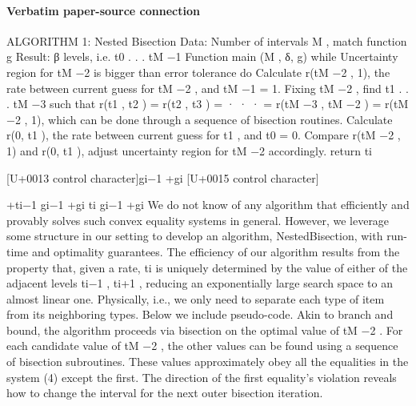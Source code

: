 \documentclass[10pt]{article}
\begin{document}
\paragraph{Verbatim paper-source connection}
\begin{ReviewVerbatim}
ALGORITHM 1: Nested Bisection
Data: Number of intervals M , match function g
Result: β levels, i.e. {t0 . . . tM −1 }
Function main (M , δ, g)
while Uncertainty region for tM −2 is bigger
than error tolerance do
Calculate r(tM −2 , 1), the rate between
current guess for tM −2 , and tM −1 = 1.
Fixing tM −2 , find t1 . . . tM −3 such that
r(t1 , t2 ) = r(t2 , t3 ) = · · · =
r(tM −3 , tM −2 ) = r(tM −2 , 1), which can be
done through a sequence of bisection
routines.
Calculate r(0, t1 ), the rate between current
guess for t1 , and t0 = 0.
Compare r(tM −2 , 1) and r(0, t1 ), adjust
uncertainty region for tM −2 accordingly.
return {ti }

[U+0013 control character]gi−1 +gi [U+0015 control character]

+ti−1 gi−1 +gi ti gi−1 +gi
We do not know of any algorithm that efficiently
and provably solves such convex equality systems
in general. However, we leverage some structure in
our setting to develop an algorithm, NestedBisection, with run-time and optimality guarantees. The
efficiency of our algorithm results from the property
that, given a rate, ti is uniquely determined by the
value of either of the adjacent levels ti−1 , ti+1 , reducing an exponentially large search space to an almost
linear one. Physically, i.e., we only need to separate
each type of item from its neighboring types.
Below we include pseudo-code. Akin to branch and
bound, the algorithm proceeds via bisection on the
optimal value of tM −2 . For each candidate value
of tM −2 , the other values can be found using a sequence of bisection subroutines. These values approximately obey all the equalities in the system (4)
except the first. The direction of the first equality’s
violation reveals how to change the interval for the
next outer bisection iteration.
\end{ReviewVerbatim}
\end{document}
